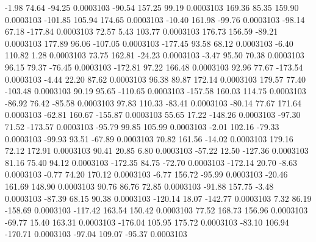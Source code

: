        -1.98       74.64      -94.25     0.0003103
      -90.54      157.25       99.19     0.0003103
      169.36       85.35      159.90     0.0003103
     -101.85      105.94      174.65     0.0003103
      -10.40      161.98      -99.76     0.0003103
      -98.14       67.18     -177.84     0.0003103
       72.57        5.43      103.77     0.0003103
      176.73      156.59      -89.21     0.0003103
      177.89       96.06     -107.05     0.0003103
     -177.45       93.58       68.12     0.0003103
       -6.40      110.82        1.28     0.0003103
       73.75      162.81      -24.23     0.0003103
       -3.47       95.50       70.38     0.0003103
       96.15       79.37      -76.45     0.0003103
     -172.81       97.22      166.48     0.0003103
       92.96       77.67     -173.54     0.0003103
       -4.44       22.20       87.62     0.0003103
       96.38       89.87      172.14     0.0003103
      179.57       77.40     -103.48     0.0003103
       90.19       95.65     -110.65     0.0003103
     -157.58      160.03      114.75     0.0003103
      -86.92       76.42      -85.58     0.0003103
       97.83      110.33      -83.41     0.0003103
      -80.14       77.67      171.64     0.0003103
      -62.81      160.67     -155.87     0.0003103
       55.65       17.22     -148.26     0.0003103
      -97.30       71.52     -173.57     0.0003103
      -95.79       99.85      105.99     0.0003103
       -2.01      102.16      -79.33     0.0003103
      -99.93       93.51      -67.89     0.0003103
       70.82      161.56      -14.02     0.0003103
      179.16       72.12      172.91     0.0003103
       90.41       20.85        6.80     0.0003103
      -57.22       12.50     -127.36     0.0003103
       81.16       75.40       94.12     0.0003103
     -172.35       84.75      -72.70     0.0003103
     -172.14       20.70       -8.63     0.0003103
       -0.77       74.20      170.12     0.0003103
       -6.77      156.72      -95.99     0.0003103
      -20.46      161.69      148.90     0.0003103
       90.76       86.76       72.85     0.0003103
      -91.88      157.75       -3.48     0.0003103
      -87.39       68.15       90.38     0.0003103
     -120.14       18.07     -142.77     0.0003103
        7.32       86.19     -158.69     0.0003103
     -117.42      163.54      150.42     0.0003103
       77.52      168.73      156.96     0.0003103
      -69.77       15.40      163.31     0.0003103
     -176.04      105.95      175.72     0.0003103
      -83.10      106.94     -170.71     0.0003103
      -97.04      109.07      -95.37     0.0003103
